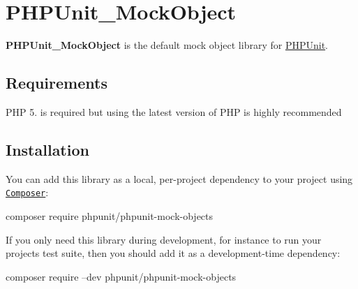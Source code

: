 \href{https://packagist.org/packages/phpunit/phpunit-mock-objects}{\tt } \href{https://php.net/}{\tt } \href{https://travis-ci.org/sebastianbergmann/phpunit-mock-objects}{\tt }

\section*{P\+H\+P\+Unit\+\_\+\+Mock\+Object}

{\bfseries P\+H\+P\+Unit\+\_\+\+Mock\+Object} is the default mock object library for \mbox{\hyperlink{namespace_p_h_p_unit}{P\+H\+P\+Unit}}.

\subsection*{Requirements}


\begin{DoxyItemize}
\item P\+HP 5. is required but using the latest version of P\+HP is highly recommended
\end{DoxyItemize}

\subsection*{Installation}

You can add this library as a local, per-\/project dependency to your project using \href{https://getcomposer.org/}{\tt Composer}\+: \begin{DoxyVerb}composer require phpunit/phpunit-mock-objects
\end{DoxyVerb}


If you only need this library during development, for instance to run your project\textquotesingle{}s test suite, then you should add it as a development-\/time dependency\+: \begin{DoxyVerb}composer require --dev phpunit/phpunit-mock-objects\end{DoxyVerb}
 